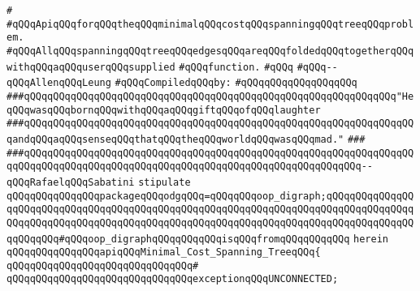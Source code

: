 \label{src/lib/graph/spanning-tree.api}
\verb|#|\newline
\verb|#qQQqApiqQQqforqQQqtheqQQqminimalqQQqcostqQQqspanningqQQqtreeqQQqproblem.|\newline
\verb|#qQQqAllqQQqspanningqQQqtreeqQQqedgesqQQqareqQQqfoldedqQQqtogetherqQQqwithqQQqaqQQquserqQQqsupplied|\newline
\verb|#qQQqfunction.|\newline
\verb|#qQQq|\newline
\verb|#qQQq--qQQqAllenqQQqLeung|\newline
\newline
\verb|#qQQqCompiledqQQqby:|\newline
\verb|#qQQqqQQqqQQqqQQqqQQq|\newline
\newline
\verb|###qQQqqQQqqQQqqQQqqQQqqQQqqQQqqQQqqQQqqQQqqQQqqQQqqQQqqQQqqQQqqQQq"HeqQQqwasqQQqbornqQQqwithqQQqaqQQqgiftqQQqofqQQqlaughter|\newline
\verb|###qQQqqQQqqQQqqQQqqQQqqQQqqQQqqQQqqQQqqQQqqQQqqQQqqQQqqQQqqQQqqQQqqQQqandqQQqaqQQqsenseqQQqthatqQQqtheqQQqworldqQQqwasqQQqmad."|\newline
\verb|###|\newline
\verb|###qQQqqQQqqQQqqQQqqQQqqQQqqQQqqQQqqQQqqQQqqQQqqQQqqQQqqQQqqQQqqQQqqQQqqQQqqQQqqQQqqQQqqQQqqQQqqQQqqQQqqQQqqQQqqQQqqQQqqQQqqQQqqQQq--qQQqRafaelqQQqSabatini|\newline
\newline
\newline
\newline
\verb|stipulate|\newline
\verb|qQQqqQQqqQQqqQQqpackageqQQqodgqQQq=qQQqqQQqoop_digraph;qQQqqQQqqQQqqQQqqQQqqQQqqQQqqQQqqQQqqQQqqQQqqQQqqQQqqQQqqQQqqQQqqQQqqQQqqQQqqQQqqQQqqQQqqQQqqQQqqQQqqQQqqQQqqQQqqQQqqQQqqQQqqQQqqQQqqQQqqQQqqQQqqQQqqQQqqQQqqQQqqQQq#qQQqoop_digraphqQQqqQQqqQQqisqQQqfromqQQqqQQqqQQq|\newline
\verb|herein|\newline
\newline
\verb|qQQqqQQqqQQqqQQqapiqQQqMinimal_Cost_Spanning_TreeqQQq{|\newline
\verb|qQQqqQQqqQQqqQQqqQQqqQQqqQQqqQQq#|\newline
\verb|qQQqqQQqqQQqqQQqqQQqqQQqqQQqqQQqexceptionqQQqUNCONNECTED;|\newline
\newline
